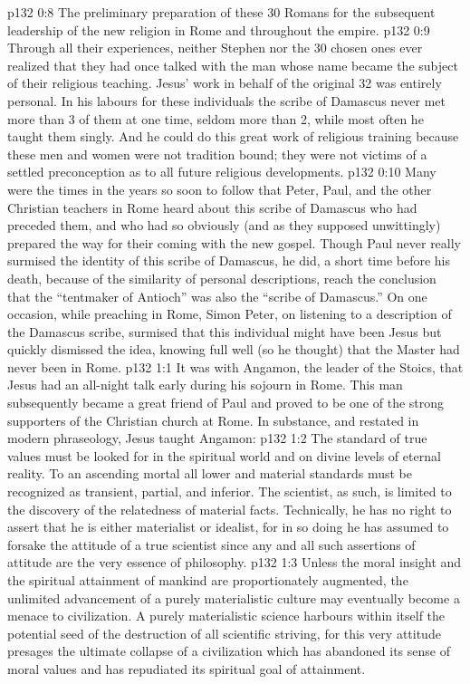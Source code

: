 \vs p132 0:8 \bibnobreakspace The preliminary preparation of these 30 Romans for the subsequent leadership of the new religion in Rome and throughout the empire.
\vs p132 0:9 \pc Through all their experiences, neither Stephen nor the 30 chosen ones ever realized that they had once talked with the man whose name became the subject of their religious teaching. Jesus’ work in behalf of the original 32 was entirely personal. In his labours for these individuals the scribe of Damascus never met more than 3 of them at one time, seldom more than 2, while most often he taught them singly. And he could do this great work of religious training because these men and women were not tradition bound; they were not victims of a settled preconception as to all future religious developments.
\vs p132 0:10 Many were the times in the years so soon to follow that Peter, Paul, and the other Christian teachers in Rome heard about this scribe of Damascus who had preceded them, and who had so obviously (and as they supposed unwittingly) prepared the way for their coming with the new gospel. Though Paul never really surmised the identity of this scribe of Damascus, he did, a short time before his death, because of the similarity of personal descriptions, reach the conclusion that the “tentmaker of Antioch” was also the “scribe of Damascus.” On one occasion, while preaching in Rome, Simon Peter, on listening to a description of the Damascus scribe, surmised that this individual might have been Jesus but quickly dismissed the idea, knowing full well (so he thought) that the Master had never been in Rome.
\vs p132 1:1 It was with Angamon, the leader of the Stoics, that Jesus had an all\hyp{}night talk early during his sojourn in Rome. This man subsequently became a great friend of Paul and proved to be one of the strong supporters of the Christian church at Rome. In substance, and restated in modern phraseology, Jesus taught Angamon:
\vs p132 1:2 \pc The standard of true values must be looked for in the spiritual world and on divine levels of eternal reality. To an ascending mortal all lower and material standards must be recognized as transient, partial, and inferior. The scientist, as such, is limited to the discovery of the relatedness of material facts. Technically, he has no right to assert that he is either materialist or idealist, for in so doing he has assumed to forsake the attitude of a true scientist since any and all such assertions of attitude are the very essence of philosophy.
\vs p132 1:3 Unless the moral insight and the spiritual attainment of mankind are proportionately augmented, the unlimited advancement of a purely materialistic culture may eventually become a menace to civilization. A purely materialistic science harbours within itself the potential seed of the destruction of all scientific striving, for this very attitude presages the ultimate collapse of a civilization which has abandoned its sense of moral values and has repudiated its spiritual goal of attainment.
